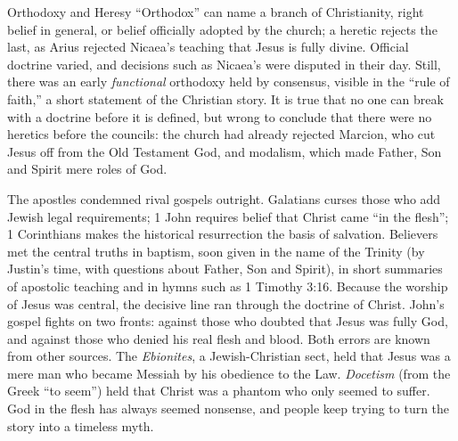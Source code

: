 \begin{sidebox}{Orthodoxy and Heresy}
``Orthodox'' can name a branch of Christianity, right belief in general, or belief officially adopted
by the church; a heretic rejects the last, as Arius rejected Nicaea's teaching that Jesus is fully
divine. Official doctrine varied, and decisions such as Nicaea's were disputed in their day. Still,
there was an early \emph{functional} orthodoxy held by consensus, visible in the ``rule of faith,'' a
short statement of the Christian story. It is true that no one can break with a doctrine before it is
defined, but wrong to conclude that there were no heretics before the councils: the church had
already rejected Marcion, who cut Jesus off from the Old Testament God, and modalism, which made
Father, Son and Spirit mere roles of God.
\end{sidebox}

The apostles condemned rival gospels outright. Galatians curses those who add Jewish legal
requirements; 1 John requires belief that Christ came ``in the flesh''; 1 Corinthians makes the
historical resurrection the basis of salvation. Believers met the central truths in baptism, soon
given in the name of the Trinity (by Justin's time, with questions about Father, Son and Spirit), in
short summaries of apostolic teaching and in hymns such as 1 Timothy 3:16. Because the worship of
Jesus was central, the decisive line ran through the doctrine of Christ. John's gospel fights on two
fronts: against those who doubted that Jesus was fully God, and against those who denied his real
flesh and blood. Both errors are known from other sources. The \emph{Ebionites}, a Jewish-Christian
sect, held that Jesus was a mere man who became Messiah by his obedience to the Law.
\emph{Docetism} (from the Greek ``to seem'') held that Christ was a phantom who only seemed to
suffer. God in the flesh has always seemed nonsense, and people keep trying to turn the story into a
timeless myth.

